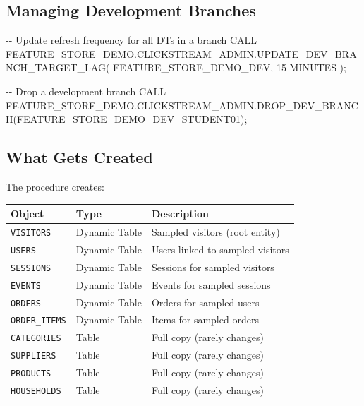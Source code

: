 \documentclass[
  letterpaper,
  DIV=11,
  numbers=noendperiod]{scrreprt}
\newenvironment{Shaded}{\begin{snugshade}}{\end{snugshade}}
\newcommand{\CommentTok}[1]{\textcolor[rgb]{0.37,0.37,0.37}{#1}}
\newcommand{\KeywordTok}[1]{\textcolor[rgb]{0.00,0.23,0.31}{#1}}
\newcommand{\NormalTok}[1]{\textcolor[rgb]{0.00,0.23,0.31}{#1}}
\newcommand{\StringTok}[1]{\textcolor[rgb]{0.13,0.47,0.30}{#1}}
\begin{document}
\hypertarget{managing-development-branches}{%
\subsection{Managing Development
Branches}\label{managing-development-branches}}

\begin{Shaded}
\begin{Highlighting}[]
\CommentTok{{-}{-} Update refresh frequency for all DTs in a branch}
\KeywordTok{CALL}\NormalTok{ FEATURE\_STORE\_DEMO.CLICKSTREAM\_ADMIN.UPDATE\_DEV\_BRANCH\_TARGET\_LAG(}
    \StringTok{\textquotesingle{}FEATURE\_STORE\_DEMO\_DEV\textquotesingle{}}\NormalTok{,}
    \StringTok{\textquotesingle{}15 MINUTES\textquotesingle{}}
\NormalTok{);}

\CommentTok{{-}{-} Drop a development branch}
\KeywordTok{CALL}\NormalTok{ FEATURE\_STORE\_DEMO.CLICKSTREAM\_ADMIN.DROP\_DEV\_BRANCH(}\StringTok{\textquotesingle{}FEATURE\_STORE\_DEMO\_DEV\_STUDENT01\textquotesingle{}}\NormalTok{);}
\end{Highlighting}
\end{Shaded}

\hypertarget{what-gets-created}{%
\subsection{What Gets Created}\label{what-gets-created}}

The procedure creates:

\begin{longtable}[]{@{}lll@{}}
\toprule\noalign{}
Object & Type & Description \\
\midrule\noalign{}
\endhead
\bottomrule\noalign{}
\endlastfoot
\texttt{VISITORS} & Dynamic Table & Sampled visitors (root entity) \\
\texttt{USERS} & Dynamic Table & Users linked to sampled visitors \\
\texttt{SESSIONS} & Dynamic Table & Sessions for sampled visitors \\
\texttt{EVENTS} & Dynamic Table & Events for sampled sessions \\
\texttt{ORDERS} & Dynamic Table & Orders for sampled users \\
\texttt{ORDER\_ITEMS} & Dynamic Table & Items for sampled orders \\
\texttt{CATEGORIES} & Table & Full copy (rarely changes) \\
\texttt{SUPPLIERS} & Table & Full copy (rarely changes) \\
\texttt{PRODUCTS} & Table & Full copy (rarely changes) \\
\texttt{HOUSEHOLDS} & Table & Full copy (rarely changes) \\
\end{longtable}
\end{document}
